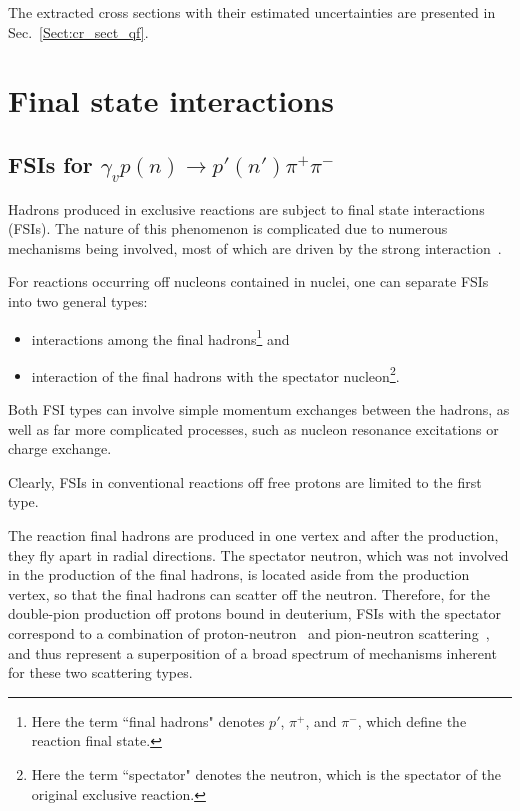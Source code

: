 \documentclass[prc,twocolumn,superscriptaddress,showpacs,amssymb,amsmath,amsfonts,aps,nofootinbib]{revtex4-1}
\begin{document}
The extracted cross sections with their estimated uncertainties are presented in Sec.\!~\ref{Sect:cr_sect_qf}.


\section{Final state interactions}
\label{Sect:discuss_fsi}

\subsection{FSIs for $\gamma_{v}p(n) \rightarrow p' (n')\pi^{+}\pi^{-}$}
\label{Sect:intro_fsi}

Hadrons produced in exclusive reactions are subject to final state interactions (FSIs). The nature of this phenomenon is complicated due to numerous mechanisms being involved, most of which are driven by the strong interaction~\cite{Darwish:2002qu,PhysRevC.84.035203}. 

For reactions occurring off nucleons contained in nuclei, one can separate FSIs into two general types:

\begin{itemize}
\item interactions among the final hadrons\footnote[3]{Here the term ``final hadrons" denotes $p'$, $\pi^{+}$, and $\pi^{-}$, which define the reaction final state.} and
\item interaction of the final hadrons with the spectator nucleon\footnote[4]{Here the term ``spectator" denotes the neutron, which is the spectator of the original exclusive reaction.}.
\end{itemize}


Both FSI types can involve simple momentum exchanges between the hadrons, as well as far more complicated processes, such as nucleon resonance excitations or charge exchange.

Clearly, FSIs in conventional reactions off free protons are limited to the first type.


The reaction final hadrons are produced in one vertex and after the production, they fly apart in radial directions.  The spectator neutron, which was not involved in the production of the final hadrons, is located aside from the production vertex, so that the final hadrons can scatter off the neutron. Therefore, for the double-pion production off protons bound in deuterium, FSIs with the spectator correspond to a combination of proton-neutron~\cite{Shirokov_Yudin:1980,PhysRev.75.705} and pion-neutron scattering~\cite{PhysRevD.20.2804,Gasparyan:2003fp,Vrana:1999nt}, and thus represent a superposition of a broad spectrum of mechanisms inherent for these two scattering types. 
\end{document}
